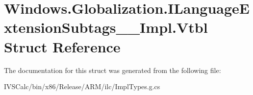 \hypertarget{struct_windows_1_1_globalization_1_1_i_language_extension_subtags_____impl_1_1_vtbl}{}\section{Windows.\+Globalization.\+I\+Language\+Extension\+Subtags\+\_\+\+\_\+\+Impl.\+Vtbl Struct Reference}
\label{struct_windows_1_1_globalization_1_1_i_language_extension_subtags_____impl_1_1_vtbl}


The documentation for this struct was generated from the following file\+:\begin{DoxyCompactItemize}
\item 
I\+V\+S\+Calc/bin/x86/\+Release/\+A\+R\+M/ilc/Impl\+Types.\+g.\+cs\end{DoxyCompactItemize}
